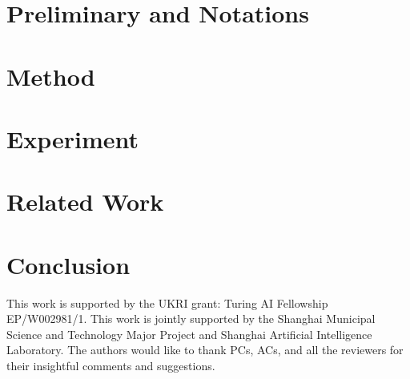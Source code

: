 \documentclass{article}
\begin{document}
\section{Preliminary and Notations}


\section{Method}



\section{Experiment}
\label{section:experiment}


\section{Related Work}


\section{Conclusion}



\begin{ack}
This work is supported by the UKRI grant: Turing AI Fellowship EP/W002981/1. 
This work is jointly supported by the Shanghai Municipal Science and Technology Major Project and Shanghai Artificial Intelligence Laboratory.
The authors would like to thank PCs, ACs, and all the reviewers for their insightful comments and suggestions.


\end{ack}





\end{document}
